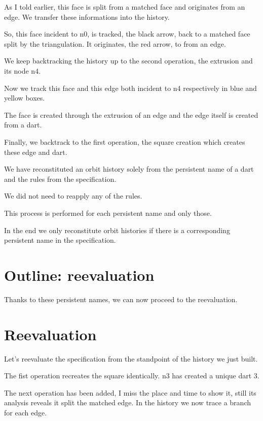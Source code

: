\documentclass[11pt]{article}
\begin{document}
As I told earlier, this face is split from a matched face and originates from an
edge. %
We transfer these informations into the history.

So, this face incident to n0, is tracked, the black arrow, back to a matched
face split by the triangulation. It originates, the red arrow, to from an edge.

We keep backtracking the history up to the second operation, the
extrusion and its node n4.

Now we track this face and this edge both incident to n4 respectively in blue
and yellow boxes.

The face is created through the extrusion of an edge and the edge itself is
created from a dart.

Finally, we backtrack to the first operation, the square creation which creates
these edge and dart.

We have reconstituted an orbit history solely from the persistent name of a dart
and the rules from the specification.

We did not need to reapply any of the rules.

This process is performed for each persistent name and only those.

In the end we only reconstitute orbit histories if there is a corresponding
persistent name in the specification.

\section*{Outline: reevaluation}
\label{sec:org04c39be}

Thanks to these persistent names, we can now proceed to the reevaluation.

\section{Reevaluation}
\label{sec:org3b38850}

Let's reevaluate the specification from the standpoint of the history we just
built.  %

The fist operation recreates the square identically. %
n3 has created a unique dart 3.

The next operation has been added, I miss the place and time to show it, still
its analysis reveals it split the matched edge. %
In the history we now trace a branch for each edge.
\end{document}
